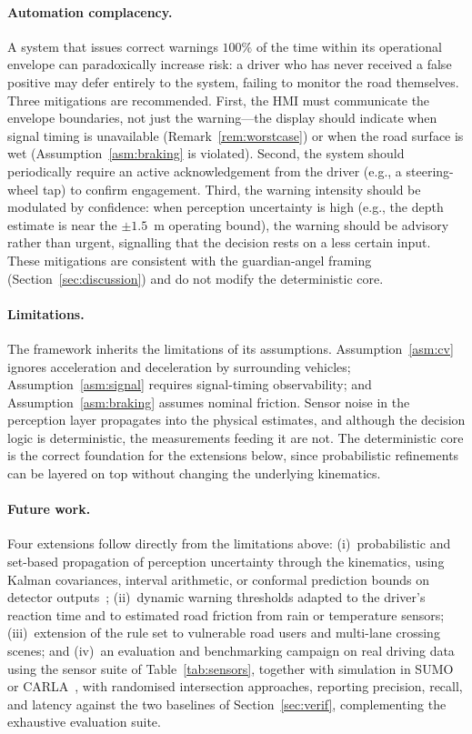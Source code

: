 \documentclass[conference, a4paper]{IEEEtran}
\theoremstyle{plain}
\begin{document}
\paragraph{Automation complacency.} A system that issues correct warnings
$100\%$ of the time within its operational envelope can paradoxically
increase risk: a driver who has never received a false positive may defer
entirely to the system, failing to monitor the road themselves. Three
mitigations are recommended. First, the HMI must communicate the envelope
boundaries, not just the warning---the display should indicate when signal
timing is unavailable (Remark~\ref{rem:worstcase}) or when the road surface
is wet (Assumption~\ref{asm:braking} is violated). Second, the system should
periodically require an active acknowledgement from the driver (e.g., a
steering-wheel tap) to confirm engagement. Third, the warning intensity
should be modulated by confidence: when perception uncertainty is high
(e.g., the depth estimate is near the ${\pm}1.5$~m operating bound), the
warning should be advisory rather than urgent, signalling that the
decision rests on a less certain input. These mitigations are consistent
with the guardian-angel framing (Section~\ref{sec:discussion}) and do not
modify the deterministic core.

\paragraph{Limitations.} The framework inherits the limitations of its
assumptions. Assumption~\ref{asm:cv} ignores acceleration and deceleration
by surrounding vehicles; Assumption~\ref{asm:signal} requires signal-timing
observability; and Assumption~\ref{asm:braking} assumes nominal friction.
Sensor noise in the perception layer propagates into the physical estimates,
and although the decision logic is deterministic, the measurements feeding
it are not. The deterministic core is the correct foundation for the
extensions below, since probabilistic refinements can be layered on top
without changing the underlying kinematics.

\paragraph{Future work.} Four extensions follow directly from the
limitations above: (i)~probabilistic and set-based propagation of perception
uncertainty through the kinematics, using Kalman covariances, interval
arithmetic, or conformal prediction bounds on detector
outputs~\cite{vovk2005}; (ii)~dynamic warning thresholds adapted to the
driver's reaction time and to estimated road friction from rain or
temperature sensors; (iii)~extension of the rule set to vulnerable road
users and multi-lane crossing scenes; and (iv)~an evaluation and benchmarking campaign on real driving data using the
sensor suite of Table~\ref{tab:sensors}, together with simulation in SUMO
or CARLA~\cite{lopez2018,dosovitskiy2017}, with randomised intersection
approaches, reporting precision, recall, and latency against the two
baselines of Section~\ref{sec:verif}, complementing the exhaustive
evaluation suite.
\end{document}
